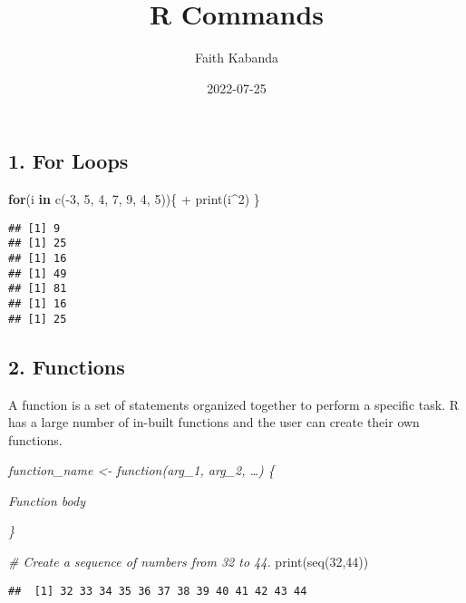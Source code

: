 \documentclass[
]{article}
\title{R Commands}
\author{Faith Kabanda}
\date{2022-07-25}
\newenvironment{Shaded}{\begin{snugshade}}{\end{snugshade}}
\newcommand{\CommentTok}[1]{\textcolor[rgb]{0.56,0.35,0.01}{\textit{#1}}}
\newcommand{\ControlFlowTok}[1]{\textcolor[rgb]{0.13,0.29,0.53}{\textbf{#1}}}
\newcommand{\DecValTok}[1]{\textcolor[rgb]{0.00,0.00,0.81}{#1}}
\newcommand{\FunctionTok}[1]{\textcolor[rgb]{0.00,0.00,0.00}{#1}}
\newcommand{\NormalTok}[1]{#1}
\newcommand{\SpecialCharTok}[1]{\textcolor[rgb]{0.00,0.00,0.00}{#1}}
\begin{document}
\maketitle

\hypertarget{for-loops}{%
\subsection{1. For Loops}\label{for-loops}}

\begin{Shaded}
\begin{Highlighting}[]
\ControlFlowTok{for}\NormalTok{(i }\ControlFlowTok{in} \FunctionTok{c}\NormalTok{(}\SpecialCharTok{{-}}\DecValTok{3}\NormalTok{, }\DecValTok{5}\NormalTok{, }\DecValTok{4}\NormalTok{, }\DecValTok{7}\NormalTok{, }\DecValTok{9}\NormalTok{, }\DecValTok{4}\NormalTok{, }\DecValTok{5}\NormalTok{))\{}
  \SpecialCharTok{+} \FunctionTok{print}\NormalTok{(i}\SpecialCharTok{\^{}}\DecValTok{2}\NormalTok{)}
\NormalTok{\}}
\end{Highlighting}
\end{Shaded}

\begin{verbatim}
## [1] 9
## [1] 25
## [1] 16
## [1] 49
## [1] 81
## [1] 16
## [1] 25
\end{verbatim}

\hypertarget{functions}{%
\subsection{2. Functions}\label{functions}}

A function is a set of statements organized together to perform a
specific task. R has a large number of in-built functions and the user
can create their own functions.

\emph{function\_name \textless- function(arg\_1, arg\_2, \ldots) \{}

\emph{Function body}

\emph{\}}

\begin{Shaded}
\begin{Highlighting}[]
\CommentTok{\# Create a sequence of numbers from 32 to 44.}
\FunctionTok{print}\NormalTok{(}\FunctionTok{seq}\NormalTok{(}\DecValTok{32}\NormalTok{,}\DecValTok{44}\NormalTok{))}
\end{Highlighting}
\end{Shaded}

\begin{verbatim}
##  [1] 32 33 34 35 36 37 38 39 40 41 42 43 44
\end{verbatim}
\end{document}
